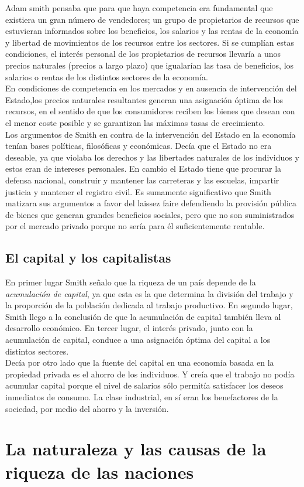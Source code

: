 \documentclass[10pt]{book}
\begin{document}
Adam smith pensaba que para que haya competencia era fundamental que existiera un gran número de vendedores; un grupo de propietarios de recursos que estuvieran informados sobre los beneficios, los salarios y las rentas de la economía y libertad de movimientos de los recursos entre los sectores. Si se cumplían estas condiciones, el interés personal de los propietarios de recursos llevaría a unos precios naturales (precios a largo plazo) que igualarían las tasa de beneficios, los salarios o rentas de los distintos sectores de la economía.\\
En condiciones de competencia en los mercados y en ausencia de intervención del Estado,los precios naturales resultantes generan una asignación óptima de los recursos, en el sentido de que los consumidores reciben los bienes que desean con el menor coste posible y se garantizan las máximas tasas de crecimiento. \\

Los argumentos de Smith en contra de la intervención del Estado en la economía tenían bases políticas, filosóficas y económicas. Decía que el Estado no era deseable, ya que violaba los derechos y las libertades naturales de los individuos y estos eran de intereses personales. En cambio el Estado tiene que procurar la defensa nacional, construir y mantener las carreteras y las escuelas, impartir justicia y mantener el registro civil. Es sumamente significativo que Smith matizara sus argumentos a favor del laissez faire defendiendo la provisión pública de bienes que generan grandes beneficios sociales, pero que no son suministrados por el mercado privado porque no sería para él suficientemente rentable.

\subsection{El capital y los capitalistas}
En primer lugar Smith señalo que la riqueza de un país depende de la \textit{acumulación de capital}, ya que esta es la que determina la división del trabajo y la proporción de la población dedicada al trabajo productivo. En segundo lugar, Smith llego a la conclusión de que la acumulación de capital también lleva al desarrollo económico. En tercer lugar, el interés privado, junto con la acumulación de capital, conduce a una asignación óptima del capital a los distintos sectores.\\

Decía por otro lado que la fuente del capital en una economía basada en la propiedad privada es el ahorro de los individuos. Y creía que el trabajo no podía acumular capital porque el nivel de salarios sólo permitía satisfacer los deseos inmediatos de consumo. La clase industrial, en sí eran los benefactores de la sociedad, por medio del ahorro y la inversión.


\section{La naturaleza y las causas de la riqueza de las naciones}
\end{document}
